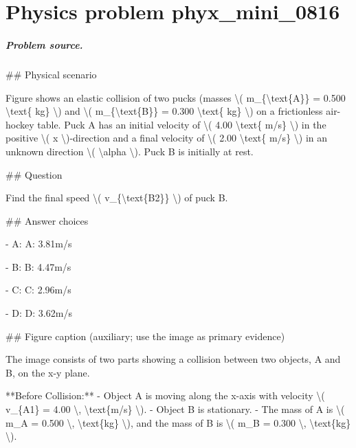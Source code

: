 
\chapter{Physics problem phyx\_mini\_0816}
\label{ch:PhyXMiniProblems_problem_phyx_mini_0816}

\paragraph{Problem source.}
\#\# Physical scenario

Figure shows an elastic collision of two pucks (masses \textbackslash{}( m\_\{\textbackslash{}text\{A\}\} = 0.500 \textbackslash{}text\{ kg\} \textbackslash{}) and \textbackslash{}( m\_\{\textbackslash{}text\{B\}\} = 0.300 \textbackslash{}text\{ kg\} \textbackslash{}) on a frictionless air-hockey table. Puck A has an initial velocity of \textbackslash{}( 4.00 \textbackslash{}text\{ m/s\} \textbackslash{}) in the positive \textbackslash{}( x \textbackslash{})-direction and a final velocity of \textbackslash{}( 2.00 \textbackslash{}text\{ m/s\} \textbackslash{}) in an unknown direction \textbackslash{}( \textbackslash{}alpha \textbackslash{}). Puck B is initially at rest.

\#\# Question

Find the final speed \textbackslash{}( v\_\{\textbackslash{}text\{B2\}\} \textbackslash{}) of puck B.

\#\# Answer choices

- A: A: 3.81m/s

- B: B: 4.47m/s

- C: C: 2.96m/s

- D: D: 3.62m/s

\#\# Figure caption (auxiliary; use the image as primary evidence)

The image consists of two parts showing a collision between two objects, A and B, on the x-y plane.

**Before Collision:**
- Object A is moving along the x-axis with velocity \textbackslash{}( v\_\{A1\} = 4.00 \textbackslash{}, \textbackslash{}text\{m/s\} \textbackslash{}).
- Object B is stationary.
- The mass of A is \textbackslash{}( m\_A = 0.500 \textbackslash{}, \textbackslash{}text\{kg\} \textbackslash{}), and the mass of B is \textbackslash{}( m\_B = 0.300 \textbackslash{}, \textbackslash{}text\{kg\} \textbackslash{}).

